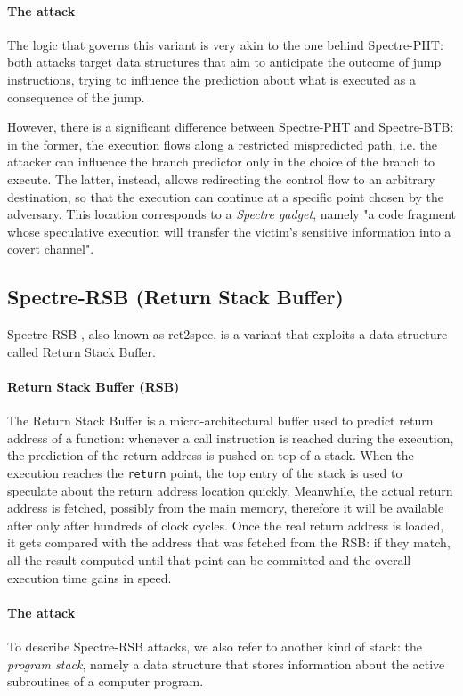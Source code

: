 \documentclass[12pt,a4paper]{book}
\theoremstyle{definition}
\begin{document}
	\paragraph{The attack} The logic that governs this variant is very akin to the one behind Spectre-PHT: both attacks target data structures that aim to anticipate the outcome of jump instructions, trying to influence the prediction about what is executed as a consequence of the jump.
	
	However, there is a significant difference between Spectre-PHT and Spectre-BTB: in the former, the execution flows along a restricted mispredicted path, i.e. the attacker can influence the branch predictor only in the choice of the branch to execute. The latter, instead, allows redirecting the control flow to an arbitrary destination, so that the execution can continue at a specific point chosen by the adversary. This location corresponds to a \textit{Spectre gadget}, namely "a code fragment whose speculative execution will transfer the victim’s sensitive information into a covert channel"\cite{Kocher2019}.
	
	\subsection{Spectre-RSB (Return Stack Buffer)}\label{sec:spectre-rsb}
	Spectre-RSB \cite{Maisuradze2018} \cite{Koruyeh2018} \cite{Canella2019}, also known as ret2spec, is a variant that exploits a data structure called Return Stack Buffer.
	
	\paragraph{Return Stack Buffer (RSB)}The Return Stack Buffer is a micro-architectural buffer used to predict return address of a function: whenever a call instruction is reached during the execution, the prediction of the return address is pushed on top of a stack. When the execution reaches the \texttt{return} point, the top entry of the stack is used to speculate about the return address location quickly. Meanwhile, the actual return address is fetched, possibly from the main memory, therefore it will be available after only after hundreds of clock cycles. Once the real return address is loaded, it gets compared with the address that was fetched from the RSB: if they match, all the result computed until that point can be committed and the overall execution time gains in speed.
	
	\paragraph{The attack} To describe Spectre-RSB attacks, we also refer to another kind of stack: the \textit{program stack}, namely a data structure that stores information about the active subroutines of a computer program.
	
\end{document}
